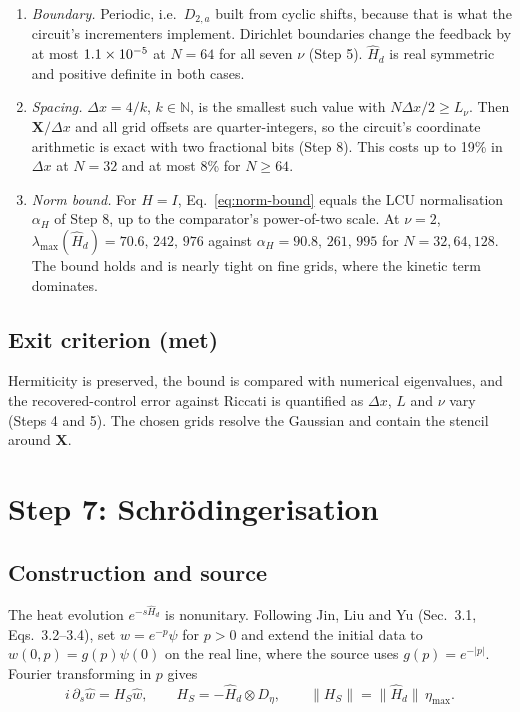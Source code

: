 \documentclass[11pt,a4paper]{article}
\begin{document}
\begin{enumerate}
\item \emph{Boundary.} Periodic, i.e.\ $D_{2,a}$ built from cyclic shifts,
because that is what the circuit's incrementers implement. Dirichlet
boundaries change the feedback by at most $1.1\times10^{-5}$ at $N=64$ for all
seven $\nu$ (Step 5). $\hat H_d$ is real
symmetric and positive definite in both cases.
\item \emph{Spacing.} $\Delta x=4/k$, $k\in\mathbb N$, is the smallest
such value with $N\Delta x/2\ge L_\nu$. Then $\mathbf X/\Delta x$ and
all grid offsets are quarter-integers, so the circuit's coordinate
arithmetic is exact with two fractional bits (Step 8). This costs up to 19\% in $\Delta x$ at $N=32$ and at most 8\% for $N\ge64$.
\item \emph{Norm bound.} For $H=I$, Eq.~\eqref{eq:norm-bound} equals the
LCU normalisation $\alpha_H$ of Step 8, up to the comparator's power-of-two
scale. At $\nu=2$, $\lambda_{\max}(\hat H_d)=70.6,\,242,\,976$ against
$\alpha_H=90.8,\,261,\,995$ for $N=32,64,128$. The bound holds and is
nearly tight on fine grids, where the kinetic term dominates.
\end{enumerate}

\subsection*{Exit criterion (met)}

Hermiticity is preserved, the bound is compared with numerical
eigenvalues, and the recovered-control error against Riccati is quantified
as $\Delta x$, $L$ and $\nu$ vary (Steps 4 and 5). The chosen grids resolve
the Gaussian and contain the stencil around $\mathbf X$.

\section{Step 7: Schr\"odingerisation}
\label{sec:stage7}

\subsection*{Construction and source}

The heat evolution $e^{-s\hat H_d}$ is nonunitary. Following Jin, Liu and
Yu \cite{jin2023} (Sec.~3.1, Eqs.~3.2--3.4), set $w=e^{-p}\psi$ for $p>0$
and extend the initial data to $w(0,p)=g(p)\psi(0)$ on the real line,
where the source uses $g(p)=e^{-|p|}$. Fourier transforming in $p$ gives
\begin{equation}
  i\,\partial_s\hat w=H_S\hat w,\qquad H_S=-\hat H_d\otimes D_\eta,\qquad
  \|H_S\|=\|\hat H_d\|\,\eta_{\max}.
  \label{eq:schrodinger}
\end{equation}
\end{document}

